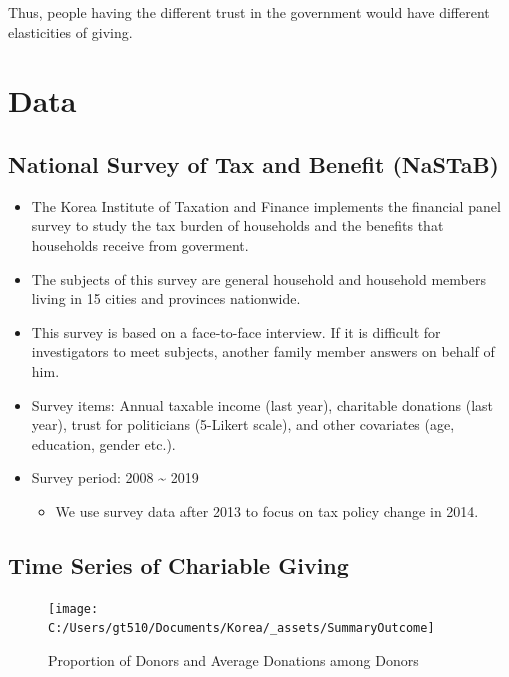 \documentclass[ review  , 3p ]{elsarticle}
\providecommand{\tightlist}{%
  \setlength{\itemsep}{0pt}\setlength{\parskip}{0pt}}
\begin{document}
  Thus, people having the different trust in the government would have different elasticities of giving.
  
  \hypertarget{data}{%
  \section{Data}\label{data}}
  
  \hypertarget{national-survey-of-tax-and-benefit-nastab}{%
  \subsection{National Survey of Tax and Benefit (NaSTaB)}\label{national-survey-of-tax-and-benefit-nastab}}
  
  \begin{itemize}
  \tightlist
  \item
    The Korea Institute of Taxation and Finance implements the financial panel survey to study the tax burden of households and the benefits that households receive from goverment.
  \item
    The subjects of this survey are general household and household members living in 15 cities and provinces nationwide.
  \item
    This survey is based on a face-to-face interview. If it is difficult for investigators to meet subjects, another family member answers on behalf of him.
  \item
    Survey items: Annual taxable income (last year), charitable donations (last year), trust for politicians (5-Likert scale), and other covariates (age, education, gender etc.).
  \item
    Survey period: 2008 \textasciitilde{} 2019
  
    \begin{itemize}
    \tightlist
    \item
      We use survey data after 2013 to focus on tax policy change in 2014.
    \end{itemize}
  \end{itemize}
  
  \hypertarget{time-series-of-chariable-giving}{%
  \subsection{Time Series of Chariable Giving}\label{time-series-of-chariable-giving}}
  
  \begin{figure}
  
  {\centering \texttt{[image: C:/Users/gt510/Documents/Korea/\_assets/SummaryOutcome]} 
  
  }
  
  \caption{Proportion of Donors and Average Donations among Donors}\label{fig:unnamed-chunk-1}
  \end{figure}
  
\end{document}
